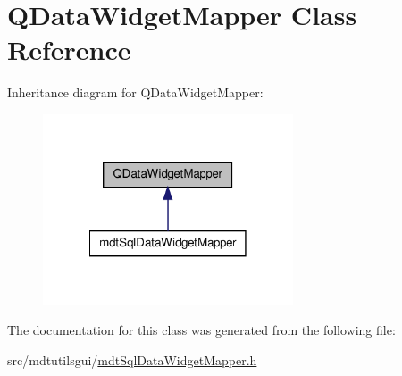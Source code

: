 \hypertarget{class_q_data_widget_mapper}{\section{Q\-Data\-Widget\-Mapper Class Reference}
\label{class_q_data_widget_mapper}
}


Inheritance diagram for Q\-Data\-Widget\-Mapper\-:\nopagebreak
\begin{figure}[H]
\begin{center}
\leavevmode
\includegraphics[width=210pt]{class_q_data_widget_mapper__inherit__graph}
\end{center}
\end{figure}


The documentation for this class was generated from the following file\-:\begin{DoxyCompactItemize}
\item 
src/mdtutilsgui/\hyperlink{mdt_sql_data_widget_mapper_8h}{mdt\-Sql\-Data\-Widget\-Mapper.\-h}\end{DoxyCompactItemize}
